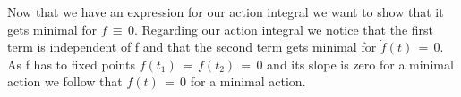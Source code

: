 Now that we have an expression for our action integral we want to show that it
gets minimal for $f \,\equiv\, 0$. Regarding our action integral we notice that
the first term is independent of f and that the second term gets minimal for
$\dot f(t) \,=\, 0$. As f has to fixed points $f(t_1) \,=\, f(t_2) \,=\, 0$ and
its slope is zero for a minimal action we follow that $f(t) \,=\, 0$ for a minimal
action. 
